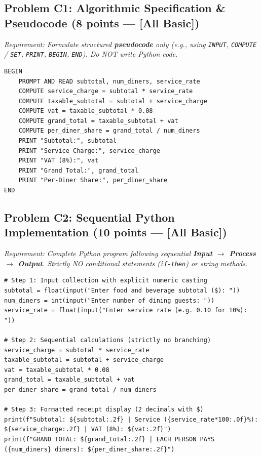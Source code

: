 \documentclass[11pt,a4paper]{article}
\begin{document}
\vspace{0.4mm}
\subsection*{Problem C1: Algorithmic Specification \& Pseudocode (8 points --- [All Basic])}
\textit{Requirement: Formulate structured \textbf{pseudocode} only (e.g., using \texttt{INPUT}, \texttt{COMPUTE} / \texttt{SET}, \texttt{PRINT}, \texttt{BEGIN}, \texttt{END}). Do NOT write Python code.}

\begin{lstlisting}[language={}]
BEGIN
    PROMPT AND READ subtotal, num_diners, service_rate
    COMPUTE service_charge = subtotal * service_rate
    COMPUTE taxable_subtotal = subtotal + service_charge
    COMPUTE vat = taxable_subtotal * 0.08
    COMPUTE grand_total = taxable_subtotal + vat
    COMPUTE per_diner_share = grand_total / num_diners
    PRINT "Subtotal:", subtotal
    PRINT "Service Charge:", service_charge
    PRINT "VAT (8%):", vat
    PRINT "Grand Total:", grand_total
    PRINT "Per-Diner Share:", per_diner_share
END
\end{lstlisting}

\vspace{0.4mm}
\subsection*{Problem C2: Sequential Python Implementation (10 points --- [All Basic])}
\textit{Requirement: Complete Python program following sequential \textbf{Input $\rightarrow$ Process $\rightarrow$ Output}. Strictly NO conditional statements (\texttt{if-then}) or string methods.}

\begin{lstlisting}
# Step 1: Input collection with explicit numeric casting
subtotal = float(input("Enter food and beverage subtotal ($): "))
num_diners = int(input("Enter number of dining guests: "))
service_rate = float(input("Enter service rate (e.g. 0.10 for 10%): "))

# Step 2: Sequential calculations (strictly no branching)
service_charge = subtotal * service_rate
taxable_subtotal = subtotal + service_charge
vat = taxable_subtotal * 0.08
grand_total = taxable_subtotal + vat
per_diner_share = grand_total / num_diners

# Step 3: Formatted receipt display (2 decimals with $)
print(f"Subtotal: ${subtotal:.2f} | Service ({service_rate*100:.0f}%): ${service_charge:.2f} | VAT (8%): ${vat:.2f}")
print(f"GRAND TOTAL: ${grand_total:.2f} | EACH PERSON PAYS ({num_diners} diners): ${per_diner_share:.2f}")
\end{lstlisting}
\end{document}
